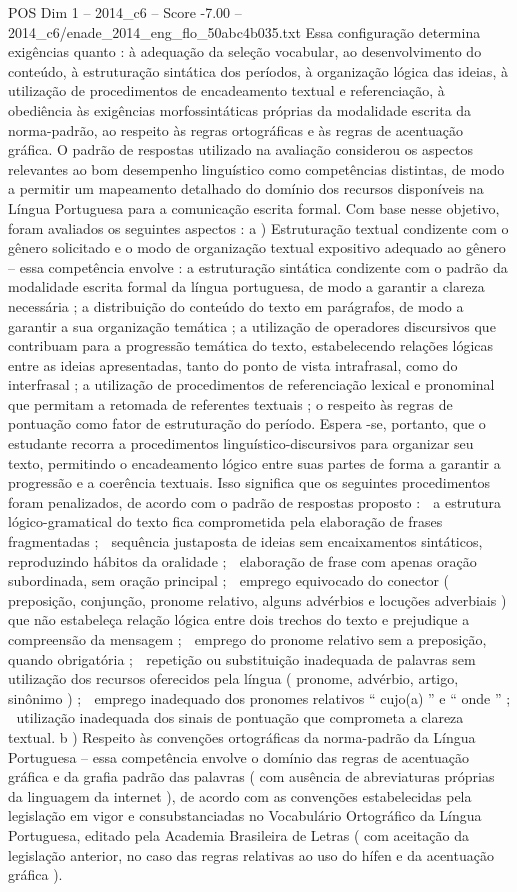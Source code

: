 \begin{textsample}{POS Dim 1 – 2014\_c6 – Score -7.00 – 2014\_c6/enade\_2014\_eng\_flo\_50abc4b035.txt}
Essa configuração determina exigências quanto : à adequação da seleção vocabular, ao desenvolvimento do conteúdo, à estruturação sintática dos períodos, à organização lógica das ideias, à utilização de procedimentos de encadeamento textual e referenciação, à obediência às exigências morfossintáticas próprias da modalidade escrita da norma-padrão, ao respeito às regras ortográficas e às regras de acentuação gráfica.
O padrão de respostas utilizado na avaliação considerou os aspectos relevantes ao bom desempenho linguístico como competências distintas, de modo a permitir um mapeamento detalhado do domínio dos recursos disponíveis na Língua Portuguesa para a comunicação escrita formal.
Com base nesse objetivo, foram avaliados os seguintes aspectos : a ) Estruturação textual condizente com o gênero solicitado e o modo de organização textual expositivo adequado ao gênero – essa competência envolve : a estruturação sintática condizente com o padrão da modalidade escrita formal da língua portuguesa, de modo a garantir a clareza necessária ; a distribuição do conteúdo do texto em parágrafos, de modo a garantir a sua organização temática ; a utilização de operadores discursivos que contribuam para a progressão temática do texto, estabelecendo relações lógicas entre as ideias apresentadas, tanto do ponto de vista intrafrasal, como do interfrasal ; a utilização de procedimentos de referenciação lexical e pronominal que permitam a retomada de referentes textuais ; o respeito às regras de pontuação como fator de estruturação do período.
Espera -se, portanto, que o estudante recorra a procedimentos linguístico-discursivos para organizar seu texto, permitindo o encadeamento lógico entre suas partes de forma a garantir a progressão e a coerência textuais.
Isso significa que os seguintes procedimentos foram penalizados, de acordo com o padrão de respostas proposto :  a estrutura lógico-gramatical do texto fica comprometida pela elaboração de frases fragmentadas ;  sequência justaposta de ideias sem encaixamentos sintáticos, reproduzindo hábitos da oralidade ;  elaboração de frase com apenas oração subordinada, sem oração principal ;  emprego equivocado do conector ( preposição, conjunção, pronome relativo, alguns advérbios e locuções adverbiais ) que não estabeleça relação lógica entre dois trechos do texto e prejudique a compreensão da mensagem ;  emprego do pronome relativo sem a preposição, quando obrigatória ;  repetição ou substituição inadequada de palavras sem utilização dos recursos oferecidos pela língua ( pronome, advérbio, artigo, sinônimo ) ;  emprego inadequado dos pronomes relativos “ cujo(a) ” e “ onde ” ;  utilização inadequada dos sinais de pontuação que comprometa a clareza textual. b ) Respeito às convenções ortográficas da norma-padrão da Língua Portuguesa – essa competência envolve o domínio das regras de acentuação gráfica e da grafia padrão das palavras ( com ausência de abreviaturas próprias da linguagem da internet ), de acordo com as convenções estabelecidas pela legislação em vigor e consubstanciadas no Vocabulário Ortográfico da Língua Portuguesa, editado pela Academia Brasileira de Letras ( com aceitação da legislação anterior, no caso das regras relativas ao uso do hífen e da acentuação gráfica ).

\end{textsample}

